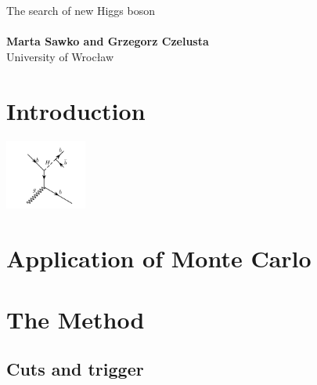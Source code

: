 \documentclass[a1,portrait]{a0poster}
\begin{document}
\begin{minipage}[b]{0.6\linewidth}
\Huge \color{2} {The search of new Higgs boson} \color{Black}\\ %
\\[1cm] %
\large \textbf{Marta Sawko and Grzegorz Czelusta}
\\[0.5cm] %
University of Wrocław
\\[0.4cm] %
\end{minipage}


\begin{multicols}{2} %
\color{3} %

\section*{Introduction}

 \begin{center}
   \includegraphics[width=0.20\textwidth]{./feynman.pdf}
 \end{center}
 
\color{Black} %

\section*{Application of Monte Carlo}


\section*{The Method}

\subsection*{Cuts and trigger}



\end{multicols}
\end{document}
